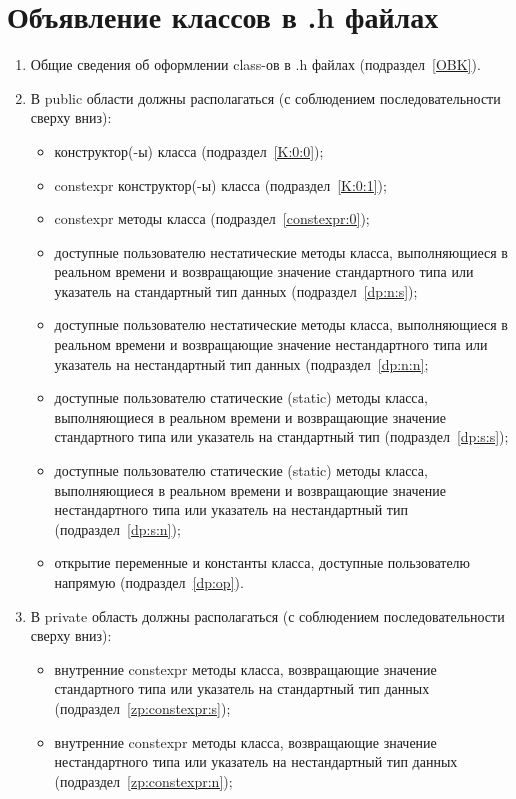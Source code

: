 \section{Объявление классов в .h файлах}\label{class:0}
\begin{enumerate}
	\item Общие сведения об оформлении class-ов в .h файлах (подраздел~\ref{OBK}).
	\item В public области должны располагаться (с соблюдением последовательности сверху вниз):\begin{itemize}
		\item конструктор(-ы) класса (подраздел~\ref{K:0:0});
		\item constexpr конструктор(-ы) класса (подраздел~\ref{K:0:1});
		\item constexpr методы класса (подраздел~\ref{constexpr:0});
		\item доступные пользователю нестатические методы класса, выполняющиеся в реальном времени и возвращающие значение стандартного типа или указатель на стандартный тип данных (подраздел~\ref{dp:n:s});
		\item доступные пользователю нестатические методы класса, выполняющиеся в реальном времени и возвращающие значение нестандартного типа или указатель на нестандартный тип данных (подраздел~\ref{dp:n:n};
		\item доступные пользователю статические (static) методы класса, выполняющиеся в реальном времени и возвращающие значение стандартного типа или указатель на стандартный тип (подраздел~\ref{dp:s:s});
		\item доступные пользователю статические (static) методы класса, выполняющиеся в реальном времени и возвращающие значение нестандартного типа или указатель на нестандартный тип (подраздел~\ref{dp:s:n});
		\item открытие переменные и константы класса, доступные пользователю напрямую (подраздел~\ref{dp:op}).
	\end{itemize}
	\item В private область должны располагаться (с соблюдением последовательности сверху вниз):\begin{itemize}
		\item внутренние constexpr методы класса, возвращающие значение стандартного типа или указатель на стандартный тип данных (подраздел~\ref{zp:constexpr:s});
		\item внутренние constexpr методы класса, возвращающие значение нестандартного типа или указатель на нестандартный тип данных (подраздел~\ref{zp:constexpr:n});

\end{itemize}
\end{enumerate}
